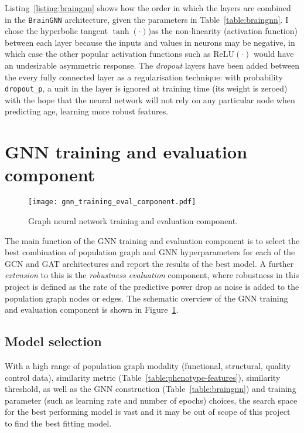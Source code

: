Listing~\ref{listing:braingnn} shows how the order in which the layers are combined in the \texttt{BrainGNN} architecture, given the parameters in Table~\ref{table:braingnn}. I chose the hyperbolic tangent $\tanh(\cdot)$)as the non-linearity (activation function) between each layer because the inputs and values in neurons may be negative, in which case the other popular activation functions such as $\mathrm{ReLU}(\cdot)$ would have an undesirable asymmetric response. The \textit{dropout} layers have been added between the every fully connected layer as a regularisation technique: with probability \texttt{dropout\_p}, a unit in the layer is ignored at training time (its weight is zeroed) with the hope that the neural network will not rely on any particular node when predicting age, learning more robust features.


\section{GNN training and evaluation component}

\begin{figure}[]
    \centering
    \texttt{[image: gnn\_training\_eval\_component.pdf]}
    \caption{Graph neural network training and evaluation component.}\label{gnn-training-eval-component}
\end{figure}

The main function of the GNN training and evaluation component is to select the best combination of population graph and GNN hyperparameters for each of the GCN and GAT architectures and report the results of the best model. A further \textit{extension} to this is the \textit{robustness evaluation} component, where robustness in this project is defined as the rate of the predictive power drop as noise is added to the population graph nodes or edges. The schematic overview of the GNN training and evaluation component is shown in Figure~\ref{gnn-training-eval-component}.


\subsection{Model selection}

With a high range of population graph modality (functional, structural, quality control data), similarity metric (Table~\ref{table:phenotype-features}), similarity threshold, as well as the GNN construction (Table~\ref{table:braingnn}) and training parameter (such as learning rate and number of epochs) choices, the search space for the best performing model is vast and it may be out of scope of this project to find the best fitting model.

